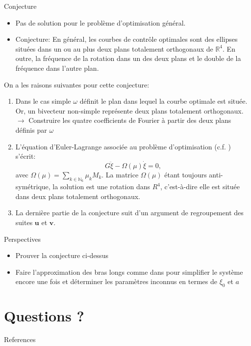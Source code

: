 \documentclass[10pt, envcountsect]{beamer}
\theoremstyle{plain}
\newcommand{\N}{\mathbb{N}}
\newcommand{\R}{\mathbb{R}}
\begin{document}
\begin{frame}{Conjecture}
\begin{itemize}
\item Pas de solution pour le problème d'optimisation général.

\item Conjecture: En général, les courbes de contrôle optimales sont des ellipses situées dans un ou au plus deux plans totalement orthogonaux de $\R^4$. En outre, la fréquence de la rotation dans un des deux plans et le double de la fréquence dans l'autre plan.
\end{itemize}
On a les raisons suivantes pour cette conjecture:
\begin{enumerate}
\item Dans le cas simple $\omega$ définit le plan dans lequel la courbe optimale est située. Or, un bivecteur non-simple représente deux plans totalement orthogonaux.
$\to$ Construire les quatre coefficients de Fourier à partir des deux plans définis par $\omega$
\end{enumerate}
\end{frame}

\begin{frame}
\begin{enumerate}
\setcounter{enumi}{1}
\item L'équation d'Euler-Lagrange associée au problème d'optimisation (c.f. \cite{DeSimone2011}) s'écrit:
\begin{equation}
G \ddot{\xi} - \Omega(\mu) \dot{\xi} = 0,
\end{equation}
avec $\Omega(\mu) = \sum_{k \in \N_6} \mu_k M_k$. La matrice $\Omega(\mu)$ étant toujours anti-symétrique, la solution est une rotation dans $R^4$, c'est-à-dire elle est située dans deux plans totalement orthogonaux.

\item La dernière partie de la conjecture suit d'un argument de regroupement des suites $\mathbf{u}$ et $\mathbf{v}$.
\end{enumerate}
\end{frame}

\begin{frame}{Perspectives}
\begin{itemize}
\item Prouver la conjecture ci-dessus

\item Faire l'approximation des bras longs comme dans \cite{Alouges2020} pour simplifier le système encore une fois et déterminer les paramètres inconnus en termes de $\xi_0$ et $a$
\end{itemize}
\end{frame}





\appendix

\section{Questions ?}

\begin{frame}[allowframebreaks]{References}

  \printbibliography

\end{frame}
\end{document}

